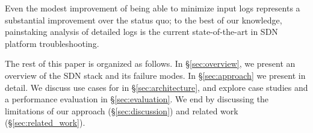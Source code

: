 Even the modest improvement of being able to minimize input
logs represents a
substantial improvement over the status quo;
to the best of our knowledge, painstaking analysis of detailed logs is the
current state-of-the-art in SDN platform troubleshooting.

The rest of this paper is organized as follows. In \S\ref{sec:overview},
we present an overview of the SDN stack and its failure modes.
In \S\ref{sec:approach} we present \simulator{} in detail.
We discuss use cases for \simulator{} in \S\ref{sec:architecture},
and explore case studies and a performance evaluation in
\S\ref{sec:evaluation}. We end by discussing the limitations of our
approach (\S\ref{sec:discussion}) and related work (\S\ref{sec:related_work}).

